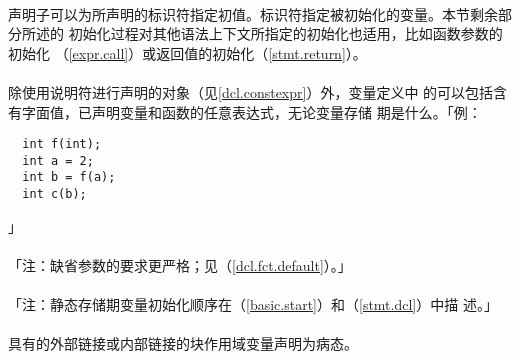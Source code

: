 \paragraph{}
声明子可以为所声明的标识符指定初值。标识符指定被初始化的变量。本节剩余部分所述的
初始化过程对其他语法上下文所指定的初始化也适用，比如函数参数的初始化
（\ref{expr.call}）或返回值的初始化（\ref{stmt.return}）。                    \\
  \synprd{\tm{\{} \tm{\}}}

\paragraph{}
除使用说明符进行声明的对象（见\ref{dcl.constexpr}）外，变量定义中
的可以包括含有字面值，已声明变量和函数的任意表达式，无论变量存储
期是什么。「例：
\begin{lstlisting}
  int f(int);
  int a = 2;
  int b = f(a);
  int c(b);
\end{lstlisting}」

\paragraph{}
「注：缺省参数的要求更严格；见（\ref{dcl.fct.default}）。」

\paragraph{}
「注：静态存储期变量初始化顺序在（\ref{basic.start}）和（\ref{stmt.dcl}）中描
述。」

\paragraph{}
具有的外部链接或内部链接的块作用域变量声明为病态。


